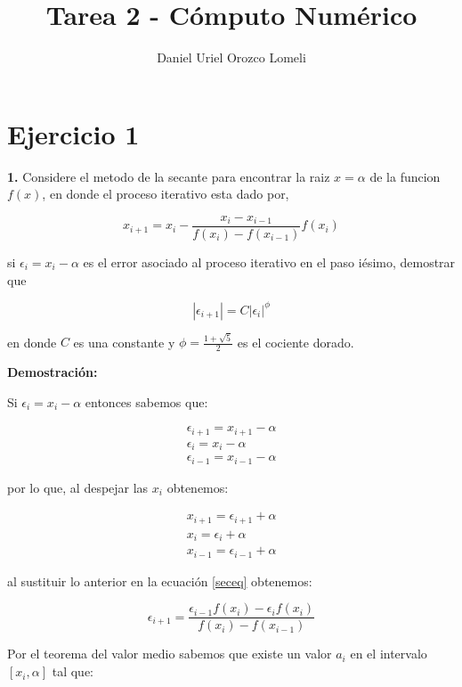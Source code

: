 \documentclass{article} %
\title{Tarea 2 - Cómputo Numérico}
\author{Daniel Uriel Orozco Lomeli}
\begin{document}
\maketitle

\section*{Ejercicio 1}
\textbf{1.} Considere el metodo de la secante para encontrar la raiz $x=\alpha$ de la funcion $f(x)$, en donde el proceso iterativo esta dado por,

\begin{equation}
\label{seceq}
    x_{i+1} = x_i - \frac{x_i - x_{i-1}}{f(x_i)-f(x_{i-1})}f(x_i)
\end{equation}

si $\epsilon_i=x_i-\alpha$ es el error asociado al proceso iterativo en el paso iésimo, demostrar que 

\begin{equation*}
    |\epsilon_{i+1}| = C|\epsilon_i|^\phi
\end{equation*}

en donde $C$ es una constante y $\phi = \frac{1 + \sqrt{5}}{2}$ es el cociente dorado.

\textbf{Demostración:}

Si $\epsilon_i=x_i-\alpha$ entonces sabemos que:

\begin{gather*}
    \epsilon_{i+1}=x_{i+1}-\alpha\\
    \epsilon_{i}=x_i-\alpha\\
    \epsilon_{i-1}=x_{i-1}-\alpha
\end{gather*}

por lo que, al despejar las $x_i$ obtenemos:

\begin{gather*}
    x_{i+1}=\epsilon_{i+1}+\alpha\\
    x_i=\epsilon_{i}+\alpha\\
    x_{i-1}=\epsilon_{i-1}+\alpha
\end{gather*}

al sustituir lo anterior en la ecuación \ref{seceq} obtenemos:

\begin{equation}
    \epsilon_{i+1} = \frac{\epsilon_{i-1}f(x_i) - \epsilon_{i}f(x_i)}{f(x_i)-f(x_{i-1})}
\end{equation}

Por el teorema del valor medio sabemos que existe un valor $a_i$ en el intervalo $[x_i,\alpha]$ tal que:
\end{document}
